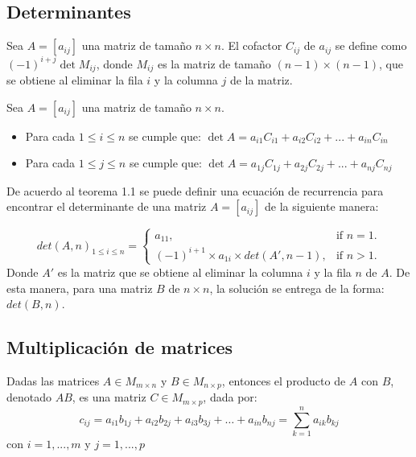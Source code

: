 \documentclass[12pt]{article}
\begin{document}
    \subsection{Determinantes}
	\begin{definition}
		Sea $A = [a_{ij}]$ una matriz de tamaño $n \times n$. El cofactor $C_{ij}$ de $a_{ij}$ se define como $(-1)^{i+j}\det {M_{ij}}$, donde $M_{ij}$ es la matriz de tamaño $(n - 1) \times (n - 1)$, que se obtiene al eliminar la fila $i$ y la columna $j$ de la matriz.\cite{algebralineal}
    \end{definition}
    
	\begin{theorem}
		Sea $A=[a_{ij}]$ una matriz de tamaño $n \times n$. \cite{algebralineal}
		\begin{itemize}
			\item Para cada $1\leq i \leq n$ se cumple que:
			$\det {A} = a_{i1}C_{i1} + a_{i2}C_{i2} + ... + a_{in}C_{in}$
			\item Para cada $1\leq j \leq n$ se cumple que:
			$\det {A} = a_{1j}C_{1j} + a_{2j}C_{2j} + ... + a_{nj}C_{nj}$
		\end{itemize}
	\end{theorem}
	De acuerdo al teorema 1.1 se puede definir una ecuación de recurrencia para encontrar el determinante de una matriz $A = [a_{ij}]$ de la siguiente manera:
	
	\begin{equation} 
	det(A, n)_{1\leq i \leq n}=\begin{cases}
	a_{11}, & \text{if $n = 1$}.\\
	(-1)^{i+1} \times a_{1i} \times det(A', n - 1) , & \text{if $n > 1$}.
	\end{cases}
	\end{equation}
	Donde $A'$ es la matriz que se obtiene al eliminar la columna $i$ y la fila $n$ de $A$. De esta manera, para una matriz $B$ de $n \times n$, la solución se entrega de la forma:
	$det(B, n)$.
	
	\subsection{Multiplicación de matrices}
	\begin{definition}
		Dadas las matrices $A \in M_{m\times n}$ y $B \in M_{n\times p}$, entonces el producto de $A$ con $B$, denotado $AB$, es una matriz $C \in M_{m\times p}$, dada por: \cite{algebralineal}
		\[
			c_{ij} = a_{i1}b_{1j} + a_{i2}b_{2j} + a_{i3}b_{3j} + \dots + a_{in}b_{nj} = \sum_{k = 1}^{n}{a_{ik}b_{kj}}		
		\]
		con $i = 1, ..., m$ y $j = 1, ..., p$
    \end{definition}
    
\end{document}
